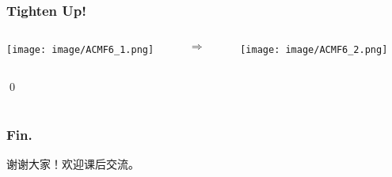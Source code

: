 \documentclass[9pt,dvipsnames,table]{beamer}
\newenvironment{qedframe}{%
	\begin{frame}[environment=qedqedframe]%
	}{%
	\qed
	\end{frame}%
}
\begin{document}
\begin{qedframe}
	\frametitle{Tighten Up!}
	\begin{columns}
		\begin{column}{0.475\textwidth}
			\begin{center}
				\texttt{[image: image/ACMF6\_1.png]}
			\end{center}
		\end{column}
		\begin{column}{0.05\textwidth}
			\begin{center}
				$\Longrightarrow$
			\end{center}
		\end{column}
		\begin{column}{0.475\textwidth}
			\begin{center}
				\texttt{[image: image/ACMF6\_2.png]}
			\end{center}
		\end{column}
	\end{columns}
\end{qedframe}

\appendix
\section{}
\begin{frame}
	\frametitle{Fin.}
	\begin{center}
		\LARGE
		谢谢大家！欢迎课后交流。
	\end{center}
\end{frame}
\end{document}

